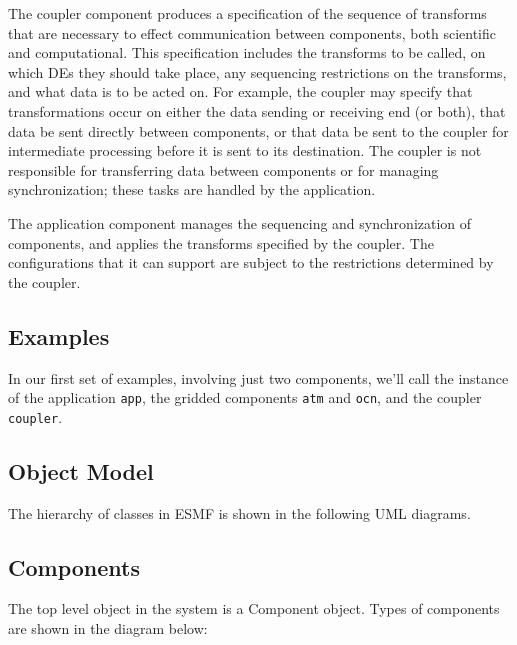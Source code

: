 The coupler component produces a specification of the sequence of 
transforms that are 
necessary to effect communication between components, both scientific and 
computational.  This specification includes the transforms to be
called, on which DEs they should take place, any sequencing restrictions 
on the transforms, and what data is to be acted on.  For example, the
coupler may specify that transformations occur on either the data sending 
or receiving end (or both), that data be sent directly between components,
or that data be sent to the coupler for intermediate processing before 
it is sent to its destination.  The coupler is not responsible for 
transferring data between components or for managing synchronization; 
these tasks are handled by the application.  

The application component manages the sequencing and synchronization of
components, and applies the transforms specified by the coupler.  The 
configurations that it can support are subject to the restrictions
determined by the coupler.

\subsection{Examples}

In our first set of examples, involving just two components, we'll call 
the instance of the application {\tt app}, the gridded components {\tt atm} 
and {\tt ocn}, and the coupler {\tt coupler}.

\subsection{Object Model}

The hierarchy of classes in ESMF is shown in the following UML diagrams.  

\subsection{Components}

The top level object in the system is a Component object.
Types of components are shown in the diagram below:



